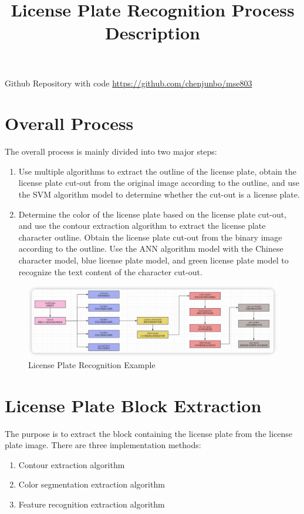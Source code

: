 \documentclass{article}
\title{License Plate Recognition Process Description}
\begin{document}
	\maketitle
	Github Repository with code  \url{https://github.com/chenjunbo/mse803}
	
	\section{Overall Process}
	The overall process is mainly divided into two major steps:
	\begin{enumerate}
		\item Use multiple algorithms to extract the outline of the license plate, obtain the license plate cut-out from the original image according to the outline, and use the SVM algorithm model to determine whether the cut-out is a license plate.
		\item Determine the color of the license plate based on the license plate cut-out, and use the contour extraction algorithm to extract the license plate character outline. Obtain the license plate cut-out from the binary image according to the outline. Use the ANN algorithm model with the Chinese character model, blue license plate model, and green license plate model to recognize the text content of the character cut-out.
	\end{enumerate}
	
	\begin{figure}[H]
		\centering
		\includegraphics[width=\linewidth]{mdpic/image-20240925000409837.png}
		\caption{License Plate Recognition Example}
	\end{figure}
	
	\section{License Plate Block Extraction}
	The purpose is to extract the block containing the license plate from the license plate image. There are three implementation methods:
	\begin{enumerate}
		\item Contour extraction algorithm
		\item Color segmentation extraction algorithm
		\item Feature recognition extraction algorithm
	\end{enumerate}
	
\end{document}
